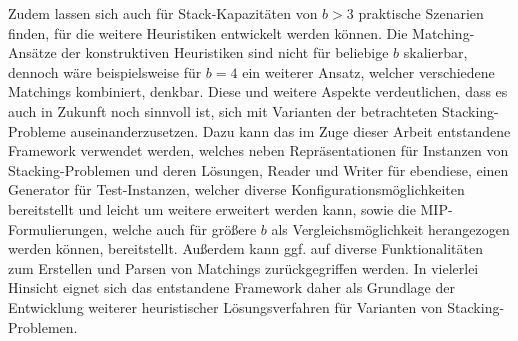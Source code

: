 Zudem lassen sich auch für Stack-Kapazitäten von $b > 3$ praktische Szenarien finden, für die weitere
Heuristiken entwickelt werden können. Die Matching-Ansätze der konstruktiven Heuristiken sind nicht für
beliebige $b$ skalierbar, dennoch wäre beispielsweise für $b = 4$ ein weiterer Ansatz, welcher verschiedene Matchings
kombiniert, denkbar. Diese und weitere Aspekte verdeutlichen, dass es auch in Zukunft noch sinnvoll ist,
sich mit Varianten der betrachteten Stacking-Probleme auseinanderzusetzen.
Dazu kann das im Zuge dieser Arbeit entstandene Framework verwendet werden,
welches neben Repräsentationen für Instanzen von Stacking-Problemen und deren Lösungen,
Reader und Writer für ebendiese, einen Generator für Test-Instanzen, welcher diverse Konfigurationsmöglichkeiten
bereitstellt und leicht um weitere erweitert werden kann, sowie die MIP-Formulierungen, welche auch für
größere $b$ als Vergleichsmöglichkeit herangezogen werden können, bereitstellt.
Außerdem kann ggf. auf diverse Funktionalitäten zum Erstellen und Parsen von Matchings zurückgegriffen werden.
In vielerlei Hinsicht eignet sich das entstandene Framework daher als Grundlage der Entwicklung
weiterer heuristischer Lösungsverfahren für Varianten von Stacking-Problemen.
